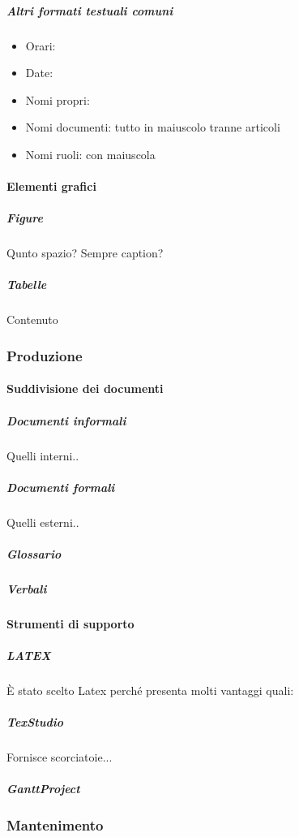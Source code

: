 			\subparagraph{Altri formati testuali comuni} %
			\begin{itemize}
				\item Orari: 
				\item Date:
				\item Nomi propri:
				\item Nomi documenti: tutto in maiuscolo tranne articoli
				\item Nomi ruoli: con maiuscola
			\end{itemize}
		
		
		
			\paragraph{Elementi grafici}
			
			\subparagraph{Figure}
			Qunto spazio? Sempre caption?
			
			\subparagraph{Tabelle}
			Contenuto
			
			
			
		\subsubsection{Produzione}

			\paragraph{Suddivisione dei documenti}
			
			\subparagraph{Documenti informali}
			Quelli interni..
			
			\subparagraph{Documenti formali}
			Quelli esterni..
			
			\subparagraph{Glossario}
			
			\subparagraph{Verbali}
			
			
			
			\paragraph{Strumenti di supporto}
			
			\subparagraph{LATEX}
			È stato scelto Latex perché presenta molti vantaggi quali:
			
			\subparagraph{TexStudio} 
			Fornisce scorciatoie...
			
			\subparagraph{GanttProject}
			
			
			
		\subsubsection{Mantenimento}
		
